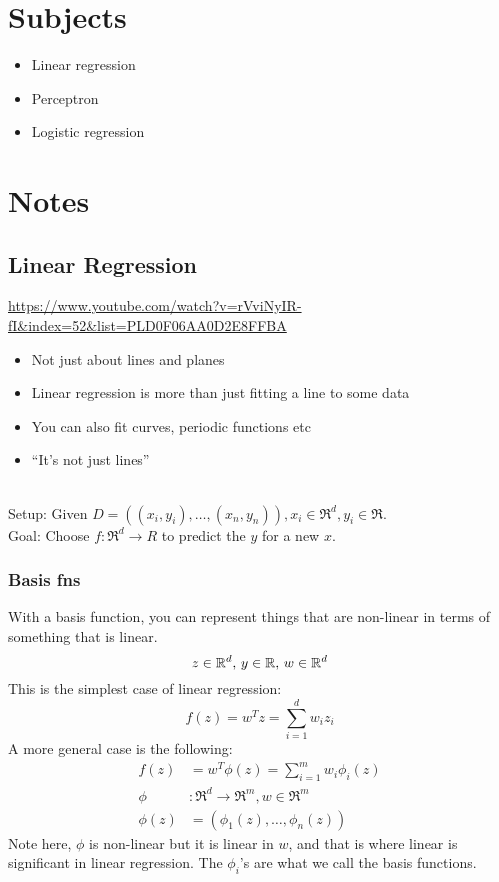 


    \section{Subjects}
    \begin{itemize}
        \item Linear regression
        \item Perceptron
        \item Logistic regression
    \end{itemize}
    \section{Notes}
    
    \subsection{Linear Regression}
    \url{https://www.youtube.com/watch?v=rVviNyIR-fI&index=52&list=PLD0F06AA0D2E8FFBA}
    
    \begin{itemize}
        \item Not just about lines and planes
        \item Linear regression is more than just fitting a line to some data
        \item You can also fit curves, periodic functions etc
        \item ``It's not just lines''
    \end{itemize}
    \ \\
    Setup: Given $D = ((x_i, y_i),\dots,(x_n, y_n)), x_i \in \Re^d, y_i \in 
    \Re$.\\
    Goal: Choose $f:\Re^d\rightarrow R$ to predict the $y$ for a new $x$.\\
    
    \subsubsection{Basis fns}
    With a basis function, you can represent things that are non-linear in 
    terms of something that is linear.
    \begin{equation*}
        z \in \Re^d,\, y\in \Re,\, w \in \Re^d\\
    \end{equation*}
    This is the simplest case of linear regression:
    \begin{equation*}
        f(z) = w^Tz = \sum_{i=1}^{d}w_iz_i
    \end{equation*}
    A more general case is the following:
    \begin{align*}
        f(z)&=w^T\phi(z)=\sum_{i=1}^{m} w_i\phi_i(z)\\
        \phi&:\Re^d\rightarrow \Re^m, w \in \Re^m\\
        \phi(z)&=(\phi_1(z),\dots,\phi_n(z))
    \end{align*}
    Note here, $\phi$ is non-linear but it is linear in $w$, and that is where 
    linear is significant in linear regression. The $\phi_i$'s are what we call 
    the basis functions.
    
